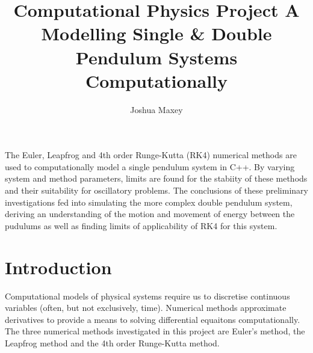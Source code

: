\documentclass[11pt]{article}
\title{Computational Physics Project A \\ Modelling Single \& Double Pendulum Systems Computationally}
\author{Joshua Maxey}
\begin{document}
\maketitle

\begin{center}
\begin{it}
The Euler, Leapfrog and 4th order Runge-Kutta (RK4) numerical methods are used to computationally model a single pendulum system in C++. By varying system and method parameters, limits are found for the stabiity of these methods and their suitability for oscillatory problems. The conclusions of these preliminary investigations fed into simulating the more complex double pendulum system, deriving an understanding of the motion and movement of energy between the pudulums as well as finding limits of applicability of RK4 for this system.
\end{it}
\end{center}

\tableofcontents
\pagebreak

\section{Introduction}
Computational models of physical systems require us to discretise continuous variables (often, but not exclusively, time). Numerical methods approximate derivatives to provide a means to solving differential equaitons computationally. The three numerical methods investigated in this project are Euler's method, the Leapfrog method and the 4th order Runge-Kutta method.

\end{document}
